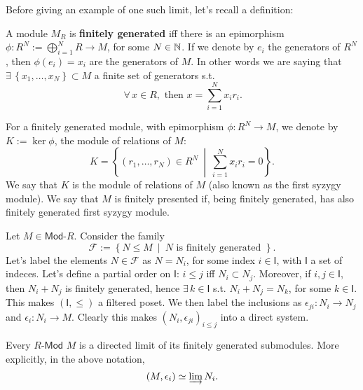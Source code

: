 Before giving an example of one such limit, let's recall a definition:
\begin{defn}
	A module $M_R$ is \textbf{finitely generated} iff there is an epimorphism
	$\phi: R^N := \bigoplus_{i=1}^N R \to M$, for some $N \in \mathbb{N}$.
	If we denote by $e_i$ the generators of $R^N$, then $\phi(e_i) = x_i$ are the generators of $M$.
	In other words we are saying that $\exists\, \left\{ x_1, \ldots, x_N \right\} \subset M$ a finite set of generators 
	s.t.
	\begin{equation}
	\,\forall\,  x \in R, \text{ then } x = \sum_{i=1}^{N} x_i r_i
	.\end{equation} 
\end{defn}

\begin{defn}
	For a finitely generated module, with epimorphism $\phi: R^N \to M$,
	we denote by $K := \ker \phi$, the module of relations of $M$:
	\begin{equation}
	K = 
	\left\{ \left( r_1, \ldots, r_N \right) \in R^N \ \middle|\ \sum_{i=1}^{N} x_i r_i = 0 \right\}
	.\end{equation} 
	We say that $K$ is the module of relations of $M$ (also known as the first syzygy module).
	We say that $M$ is finitely presented if, being finitely generated, has also finitely generated first syzygy module.
\end{defn}

\begin{ex}
	Let $M \in \mathsf{Mod}\text{-}R$.
	Consider the family
	\begin{equation}
	\mathcal{F} := \left\{ N \leq M \ \middle|\ 
	N \text{ is finitely generated } \right\}
	.\end{equation} 
	Let's label the elements $N \in \mathcal{F}$ as $N= N_i$, for some index $i \in \mathsf{I}$, with $\mathsf{I}$ a set of indeces.
	Let's define a partial order on $\mathsf{I}$:
	$i \leq j$ iff $N_i \subset N_j$.
	Moreover, if $i, j \in \mathsf{I}$, then $N_i + N_j$ is finitely generated, hence $\exists\, k \in \mathsf{I}$ s.t.
	$N_i + N_j = N_k$, for some $k \in \mathsf{I}$.
	This makes $\left( \mathsf{I}, \leq \right)$ a filtered poset.
	We then label the inclusions as $\epsilon_{ji}: N_i \to N_j$ and $\epsilon_i: N_i \to M$.
	Clearly this makes $\left(N_i, \epsilon_{ji}\right)_{i \leq j}$ into a direct system.
\end{ex} 

\begin{prop}
	Every $R\text{-}\mathsf{Mod}$ $M$ is a directed limit of its finitely generated submodules.
	More explicitly, in the above notation,
	\begin{equation}
	\left(M, \epsilon_i\right) \simeq \varinjlim N_i
	.\end{equation} 
\end{prop} 

